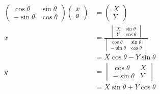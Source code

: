\documentclass{article}
\begin{document}
\setcounter{subsubsection}{36}
\subsubsection{}

\begin{align*}
  \begin{pmatrix}
    \cos \theta  & \sin \theta \\
    -\sin \theta & \cos \theta
  \end{pmatrix} \begin{pmatrix}
                  x \\
                  y
                \end{pmatrix} & = \begin{pmatrix}
                                    X \\
                                    Y
                                  \end{pmatrix}                                    \\
  x                             & = \frac{\begin{vmatrix}
                                              X & \sin \theta \\
                                              Y & \cos \theta
                                            \end{vmatrix}}{\begin{vmatrix}
                                                             \cos \theta  & \sin \theta \\
                                                             -\sin \theta & \cos \theta
                                                           \end{vmatrix}} \\
                                & = X \cos \theta - Y \sin \theta                   \\
  y                             & = \begin{vmatrix}
                                      \cos \theta  & X \\
                                      -\sin \theta & Y
                                    \end{vmatrix}                                \\
                                & = X \sin \theta + Y \cos \theta
\end{align*}

\setcounter{subsubsection}{38}
\end{document}
